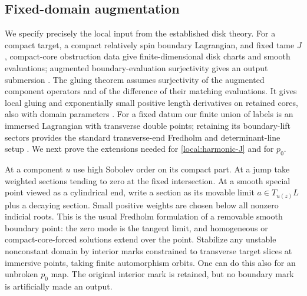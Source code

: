 \subsection{Fixed-domain augmentation}

We specify precisely the local input from the established disk theory.
For a compact target, a compact relatively spin boundary Lagrangian,
and fixed tame $J$, compact-core obstruction data give finite-dimensional
disk charts and smooth evaluations; augmented boundary-evaluation
surjectivity gives an output submersion
\cite[Theorem~7.1, Condition~7.11, and Lemma~7.12]{fooo-i}.
The gluing theorem assumes surjectivity of the augmented component
operators and of the difference of their matching evaluations.
It gives local gluing and exponentially small positive length
derivatives on retained cores, also with domain parameters
\cite[Assumption~3.12, Theorems~3.13, 6.4, and 8.16--8.17]{fooo-decay}.
For a fixed datum our finite union of labels is an immersed Lagrangian
with transverse double points; retaining its boundary-lift sectors
provides the standard transverse-end Fredholm and determinant-line
setup \cite[Sections~4--5]{akaho-joyce}.  We next prove the extensions
needed for \eqref{local:harmonic-J} and for $p_0$.

At a component $u$ use high Sobolev order on its compact part.  At a
jump take weighted sections tending to zero at the fixed intersection.
At a smooth special point viewed as a cylindrical end, write a section
as its movable limit $a\in T_{u(z)}L$ plus a decaying section.  Small
positive weights are chosen below all nonzero indicial roots.  This
is the usual Fredholm formulation of a removable smooth boundary
point: the zero mode is the tangent limit, and homogeneous or
compact-core-forced solutions extend over the point.  Stabilize any
unstable nonconstant domain by interior marks constrained to transverse
target slices at immersive points, taking finite automorphism orbits.
One can do this also for an unbroken $p_0$ map.  The original interior
mark is retained, but no boundary mark is artificially made an output.


